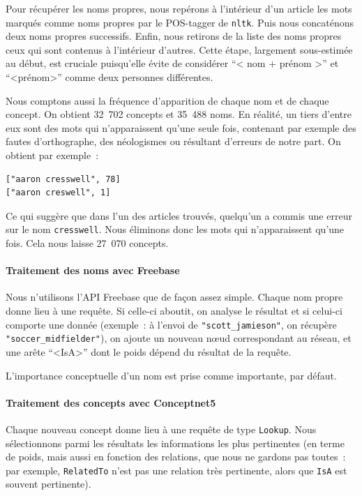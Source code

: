 \documentclass[a4paper, 12pt]{article}
\newcommand{\pyt}[1]{\texttt{#1}}%
\begin{document}
Pour récupérer les noms propres, nous repérons à l'intérieur d'un article les mots marqués comme noms propres par le POS-tagger de \pyt{nltk}. Puis nous concaténons deux noms propres successifs. Enfin, nous retirons de la liste des noms propres ceux qui sont contenus à l'intérieur d'autres. Cette étape, largement sous-estimée au début, est cruciale puisqu'elle évite de considérer ``< nom + prénom >'' et ``<prénom>'' comme deux personnes différentes.

Nous comptons aussi la fréquence d'apparition de chaque nom et de chaque concept. 
On obtient 32~702 concepts et 35~488 noms. En réalité, un tiers d'entre eux sont des mots qui n'apparaissent qu'une seule fois, contenant par exemple des fautes d'orthographe, des néologismes ou résultant d'erreurs de notre part. On obtient par exemple~:
\begin{verbatim}
["aaron cresswell", 78]
["aaron creswell", 1]
\end{verbatim}
Ce qui suggère que dans l'un des articles trouvés, quelqu'un a commis une erreur sur le nom \verb|cresswell|. Nous éliminons donc les mots qui n'apparaissent qu'une fois. Cela nous laisse 27~070 concepts.

\paragraph{Traitement des noms avec Freebase}

Nous n'utilisons l'API Freebase que de fa\c{c}on assez simple. Chaque nom propre donne lieu à une requête. Si celle-ci aboutit, on analyse le résultat et si celui-ci comporte une donnée (exemple~: à l'envoi de \verb|"scott_jamieson"|, on récupère \verb|"soccer_midfielder"|), on ajoute un nouveau nœud correspondant au réseau, et une arête ``<IsA>'' dont le poids dépend du résultat de la requête.

L'importance conceptuelle d'un nom est prise comme importante, par défaut.

\paragraph{Traitement des concepts avec Conceptnet5}

Chaque nouveau concept donne lieu à une requête de type \verb|Lookup|. Nous sélectionnons parmi les résultats les informations les plus pertinentes (en terme de poids, mais aussi en fonction des relations, que nous ne gardons pas toutes~: par exemple, \verb|RelatedTo| n'est pas une relation très pertinente, alors que \verb|IsA| est souvent pertinente).
\end{document}
